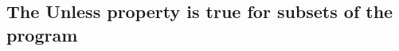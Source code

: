 \begin{appendices}
\section{The \textbf{Unless} property is true for subsets of the program}
\label{code:less-unless}
\begin{code}
    \>[2]\AgdaSpace{}%
    \AgdaSymbol{:}\AgdaSpace{}%
    \AgdaSymbol{(}\AgdaSpace{}%
    \AgdaOperator{\AgdaFunction{▷[}}\AgdaSpace{}%
    \AgdaSpace{}%
    \AgdaSpace{}%
    \AgdaSpace{}%
    \AgdaOperator{\AgdaFunction{]}}\AgdaSpace{}%
    \AgdaSymbol{)}\AgdaSpace{}%
    \AgdaSpace{}%
    \AgdaSymbol{(}\AgdaSpace{}%
    \AgdaOperator{\AgdaFunction{▷[}}\AgdaSpace{}%
    \AgdaSpace{}%
    \AgdaOperator{\AgdaFunction{]}}\AgdaSpace{}%
    \AgdaSymbol{)}\<%
    \\
    \>[2]\AgdaSpace{}%
    \AgdaSpace{}%
    \AgdaSymbol{=}\AgdaSpace{}%
    \AgdaSpace{}%
    \AgdaSpace{}%
    \AgdaSpace{}%
    \AgdaSpace{}%
    \AgdaSymbol{(}\AgdaSpace{}%
    \AgdaSymbol{)}\<%
\end{code}


\end{appendices}
